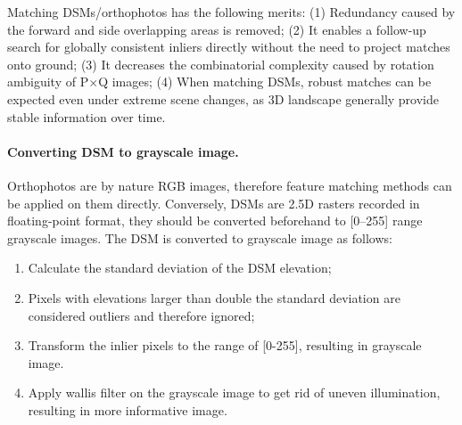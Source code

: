 %


\par
Matching DSMs/orthophotos has the following merits: (1) Redundancy caused by the forward and side overlapping areas is removed; (2) It enables a follow-up search for globally consistent inliers directly without the need to project matches onto ground; (3) It decreases the combinatorial complexity caused by rotation ambiguity of P$\times$Q images; (4) When matching DSMs, robust matches can be expected even under extreme scene changes, as 3D landscape generally provide stable information over time.\\
\paragraph{Converting \ac{DSM} to grayscale image.} Orthophotos are by nature RGB images, therefore feature matching methods can be applied on them directly. Conversely, DSMs are 2.5D rasters recorded in floating-point format, they should be converted beforehand to [0–255] range grayscale images. The DSM is converted to grayscale image as follows:\\
\begin{enumerate}
	\item Calculate the standard deviation of the DSM elevation;
	\item Pixels with elevations larger than double the standard deviation are considered outliers and therefore ignored;
	\item Transform the inlier pixels to the range of [0-255], resulting in grayscale image.
	\item Apply wallis filter on the grayscale image to get rid of uneven illumination, resulting in more informative image.
\end{enumerate}

